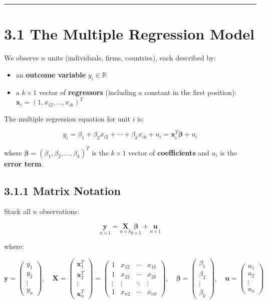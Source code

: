 \medskip\hrule\medskip

\section{3.1 The Multiple Regression Model}

We observe $n$ units (individuals, firms, countries), each described by:
\begin{itemize}
\item an \textbf{outcome variable} $y_i \in \mathbb{R}$
\item a $k \times 1$ vector of \textbf{regressors} (including a constant in the first position): $\mathbf{x}_i = (1, x_{i2}, \ldots, x_{ik})^T$
\end{itemize}

The multiple regression equation for unit $i$ is:

\[
y_i = \beta_1 + \beta_2 x_{i2} + \cdots + \beta_k x_{ik} + u_i = \mathbf{x}_i^T \boldsymbol{\beta} + u_i
\]

where $\boldsymbol{\beta} = (\beta_1, \beta_2, \ldots, \beta_k)^T$ is the $k \times 1$ vector of \textbf{coefficients} and $u_i$ is the \textbf{error term}.

\subsection{3.1.1 Matrix Notation}

Stack all $n$ observations:

\[
\underset{n \times 1}{\mathbf{y}} = \underset{n \times k}{\mathbf{X}} \underset{k \times 1}{\boldsymbol{\beta}} + \underset{n \times 1}{\mathbf{u}}
\]

where:

\[
\mathbf{y} = \begin{pmatrix} y_1 \\ y_2 \\ \vdots \\ y_n \end{pmatrix}, \quad
\mathbf{X} = \begin{pmatrix} \mathbf{x}_1^T \\ \mathbf{x}_2^T \\ \vdots \\ \mathbf{x}_n^T \end{pmatrix} = \begin{pmatrix} 1 & x_{12} & \cdots & x_{1k} \\ 1 & x_{22} & \cdots & x_{2k} \\ \vdots & \vdots & \ddots & \vdots \\ 1 & x_{n2} & \cdots & x_{nk} \end{pmatrix}, \quad
\boldsymbol{\beta} = \begin{pmatrix} \beta_1 \\ \beta_2 \\ \vdots \\ \beta_k \end{pmatrix}, \quad
\mathbf{u} = \begin{pmatrix} u_1 \\ u_2 \\ \vdots \\ u_n \end{pmatrix}
\]

